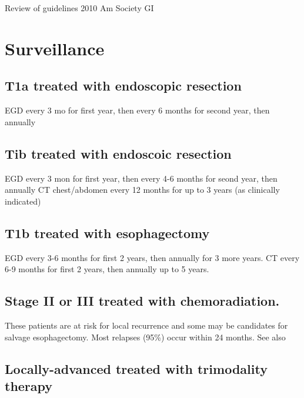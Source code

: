 \documentclass[
]{book}
\begin{document}
\citep{vakil1791}

Review of guidelines 2010 Am Society GI \citep{sharma258}

\hypertarget{eso_surveillance}{%
\chapter{Surveillance}\label{eso_surveillance}}

\hypertarget{t1a-treated-with-endoscopic-resection}{%
\section{T1a treated with endoscopic resection}\label{t1a-treated-with-endoscopic-resection}}

EGD every 3 mo for first year, then every 6 months for second year, then annually\citep{shaheen30}

\hypertarget{tib-treated-with-endoscoic-resection}{%
\section{Tib treated with endoscoic resection}\label{tib-treated-with-endoscoic-resection}}

EGD every 3 mon for first year, then every 4-6 months for seond year, then annually
CT chest/abdomen every 12 months for up to 3 years (as clinically indicated)

\hypertarget{t1b-treated-with-esophagectomy}{%
\section{T1b treated with esophagectomy}\label{t1b-treated-with-esophagectomy}}

EGD every 3-6 months for first 2 years, then annually for 3 more years.
CT every 6-9 months for first 2 years, then annually up to 5 years.

\hypertarget{stage-ii-or-iii-treated-with-chemoradiation.}{%
\section{Stage II or III treated with chemoradiation.}\label{stage-ii-or-iii-treated-with-chemoradiation.}}

These patients are at risk for local recurrence \citep{sudo3400} and some may be candidates for salvage esophagectomy. Most relapses (95\%) occur within 24 months. See also \citep{taketa1139}

\hypertarget{locally-advanced-treated-with-trimodality-therapy}{%
\section{Locally-advanced treated with trimodality therapy}\label{locally-advanced-treated-with-trimodality-therapy}}
\end{document}
